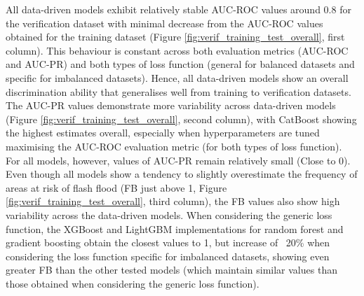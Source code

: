 All  data-driven models exhibit relatively stable AUC-ROC values around 0.8 for the \textcolor{colourTest}{verification dataset} with minimal decrease from the AUC-ROC values obtained for the \textcolor{colourTraining}{training dataset} (Figure \ref{fig:verif_training_test_overall}, first column). This behaviour is constant across both evaluation metrics (AUC-ROC and AUC-PR) and both types of loss function (general for balanced datasets and specific for imbalanced datasets). Hence, all data-driven models show an overall discrimination ability that generalises well from training to verification datasets. The AUC-PR values demonstrate more variability across data-driven models (Figure \ref{fig:verif_training_test_overall}, second column), with CatBoost showing the highest estimates overall, especially when hyperparameters are tuned maximising the AUC-ROC evaluation metric (for both types of loss function). For all models, however, values of AUC-PR remain relatively small (Close to 0). Even though all models show a tendency to slightly overestimate the frequency of areas at risk of flash flood (FB just above 1, Figure \ref{fig:verif_training_test_overall}, third column), the FB values also show high variability across the data-driven models. When considering the generic loss function, the XGBoost and LightGBM implementations for random forest and gradient boosting obtain the closest values to 1, but increase of ~20\% when considering the loss function specific for imbalanced datasets, showing even greater FB than the other tested models (which maintain similar values than those obtained when considering the generic loss function).

